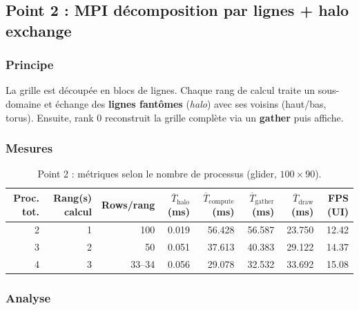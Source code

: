 \documentclass[11pt,a4paper]{article}
\begin{document}
\subsection{Point 2 : MPI décomposition par lignes + halo exchange}

\subsubsection{Principe}

La grille est découpée en blocs de lignes. Chaque rang de calcul traite un sous-domaine et échange des \textbf{lignes fantômes} (\emph{halo}) avec ses voisins (haut/bas, torus). Ensuite, rank 0 reconstruit la grille complète via un \textbf{gather} puis affiche.

\subsubsection{Mesures}

\begin{table}[H]
  \centering
  \scriptsize
  \caption{Point 2 : métriques selon le nombre de processus (glider, $100 \times 90$).}
  \label{tab:mpi-p2}
  \begin{tabular}{@{}rrrrrrrr@{}}
    \toprule
    Proc. tot. & Rang(s) calcul & Rows/rang & $\overline{T}_{\text{halo}}$ (ms) & $\overline{T}_{\text{compute}}$ (ms) & $\overline{T}_{\text{gather}}$ (ms) & $\overline{T}_{\text{draw}}$ (ms) & FPS (UI) \\
    \midrule
    2 & 1 & 100 & 0.019 & 56.428 & 56.587 & 23.750 & 12.42 \\
    3 & 2 & 50  & 0.051 & 37.613 & 40.383 & 29.122 & 14.37 \\
    4 & 3 & 33--34 & 0.056 & 29.078 & 32.532 & 33.692 & 15.08 \\
    \bottomrule
  \end{tabular}
\end{table}

\subsubsection{Analyse}
\end{document}
